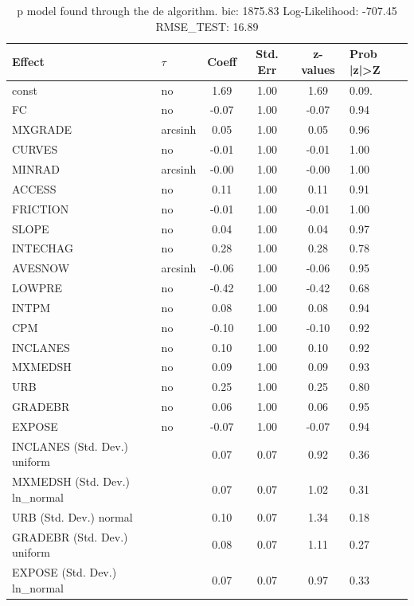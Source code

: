 \begin{table}
	\caption{p model found through the de algorithm. bic: 1875.83 Log-Likelihood: -707.45 RMSE_TEST: 16.89}
	\begin{center}
		\begin{tabular}{|l|l|c|c|c|l|}
			\hline
			Effect & $\tau$ & Coeff & Std. Err & z-values & Prob |z|>Z \\
			\hline
			const & no & 1.69 & 1.00 & 1.69 & 0.09. \\
			\hline
			FC & no & -0.07 & 1.00 & -0.07 & 0.94 \\
			\hline
			MXGRADE & arcsinh & 0.05 & 1.00 & 0.05 & 0.96 \\
			\hline
			CURVES & no & -0.01 & 1.00 & -0.01 & 1.00 \\
			\hline
			MINRAD & arcsinh & -0.00 & 1.00 & -0.00 & 1.00 \\
			\hline
			ACCESS & no & 0.11 & 1.00 & 0.11 & 0.91 \\
			\hline
			FRICTION & no & -0.01 & 1.00 & -0.01 & 1.00 \\
			\hline
			SLOPE & no & 0.04 & 1.00 & 0.04 & 0.97 \\
			\hline
			INTECHAG & no & 0.28 & 1.00 & 0.28 & 0.78 \\
			\hline
			AVESNOW & arcsinh & -0.06 & 1.00 & -0.06 & 0.95 \\
			\hline
			LOWPRE & no & -0.42 & 1.00 & -0.42 & 0.68 \\
			\hline
			INTPM & no & 0.08 & 1.00 & 0.08 & 0.94 \\
			\hline
			CPM & no & -0.10 & 1.00 & -0.10 & 0.92 \\
			\hline
			INCLANES & no & 0.10 & 1.00 & 0.10 & 0.92 \\
			\hline
			MXMEDSH & no & 0.09 & 1.00 & 0.09 & 0.93 \\
			\hline
			URB & no & 0.25 & 1.00 & 0.25 & 0.80 \\
			\hline
			GRADEBR & no & 0.06 & 1.00 & 0.06 & 0.95 \\
			\hline
			EXPOSE & no & -0.07 & 1.00 & -0.07 & 0.94 \\
			\hline
			INCLANES (Std. Dev.) uniform &  & 0.07 & 0.07 & 0.92 & 0.36 \\
			\hline
			MXMEDSH (Std. Dev.) ln_normal &  & 0.07 & 0.07 & 1.02 & 0.31 \\
			\hline
			URB (Std. Dev.) normal &  & 0.10 & 0.07 & 1.34 & 0.18 \\
			\hline
			GRADEBR (Std. Dev.) uniform &  & 0.08 & 0.07 & 1.11 & 0.27 \\
			\hline
			EXPOSE (Std. Dev.) ln_normal &  & 0.07 & 0.07 & 0.97 & 0.33 \\
			\hline
		\end{tabular}
	\end{center}
\end{table}